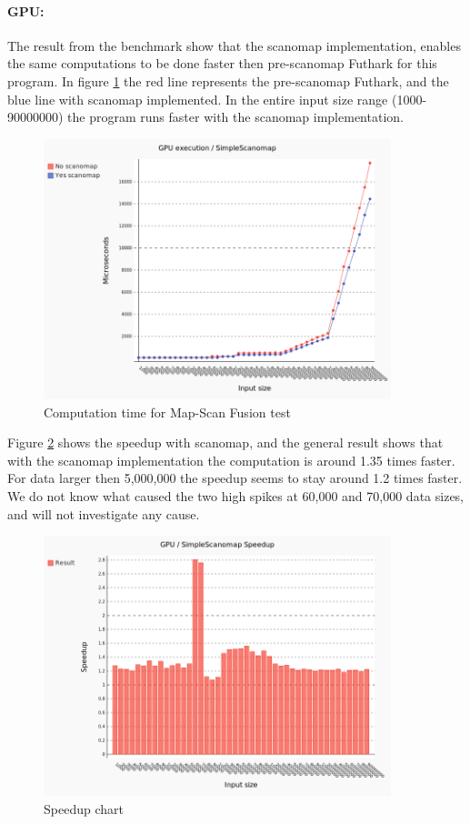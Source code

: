 \documentclass[11pt]{article}
\begin{document}
\paragraph*{GPU:} The result from the benchmark show that the scanomap implementation, enables the same computations to be done faster then pre-scanomap Futhark for this program. In figure \ref{fig:map-scan fusion test} the red line represents the pre-scanomap Futhark, and the blue line with scanomap implemented. In the entire input size range (1000-90000000) the program runs faster with the scanomap implementation.

\begin{figure}[h!]
  \centering
    \includegraphics[width=0.9\textwidth]{images/chart.png}
  \caption{Computation time for Map-Scan Fusion test}
  \label{fig:map-scan fusion test}
\end{figure}

Figure \ref{fig:map-scan fusion speedup} shows the speedup with scanomap, and the general result shows that with the scanomap implementation the computation is around 1.35 times faster. For data larger then 5,000,000 the speedup seems to stay around 1.2 times faster. We do not know what caused the two high spikes at 60,000 and 70,000 data sizes, and will not investigate any cause.

\begin{figure}[h!]
  \centering
    \includegraphics[width=0.9\textwidth]{images/comparing.png}
  \caption{Speedup chart}
  \label{fig:map-scan fusion speedup}
\end{figure}
\end{document}
